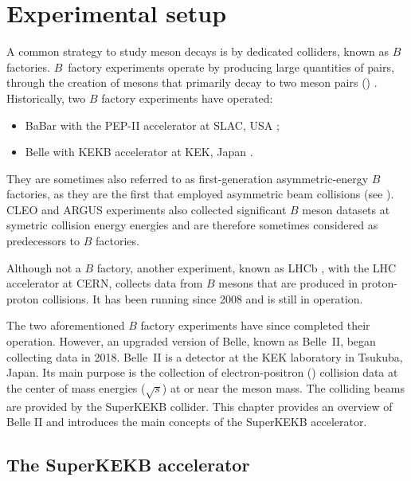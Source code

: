 \chapter{Experimental setup}\label{chap:belle2}

A common strategy to study \B meson decays is by dedicated colliders, known as $B$ factories.
$B$~factory experiments operate by producing large quantities of \BB pairs, through the creation of \FourS mesons that primarily decay to two \B meson pairs (\BB) \cite{Workman:2022ynf}.
Historically, two $B$ factory experiments have operated:
\begin{itemize}
    \item BaBar with the PEP-II accelerator at SLAC, USA \cite{BaBar:1995bns};
    \item Belle with KEKB accelerator at KEK, Japan \cite{Belle:2000cnh}.
\end{itemize}
They are sometimes also referred to as first-generation asymmetric-energy $B$ factories, as they are the first that employed asymmetric beam collisions (see ).
CLEO \cite{CLEO:1982pvq} and ARGUS \cite{ARGUS:1988bds} experiments also collected significant $B$ meson datasets at symetric \epem collision energy \FourS energies and are therefore sometimes considered as predecessors to $B$ factories. 

Although not a $B$ factory, another experiment, known as LHCb \cite{LHCb:2008vvz}, with the LHC accelerator at CERN, collects data from $B$ mesons that are produced in proton-proton collisions.
It has been running since 2008 and is still in operation.

The two aforementioned $B$ factory experiments have since completed their operation.
However, an upgraded version of Belle, known as Belle~II, began collecting data in 2018.
Belle~II is a detector at the KEK laboratory in Tsukuba, Japan.
Its main purpose is the collection of electron-positron (\epem) collision data 
at the center of mass energies ($\sqrt{s}$) at or near the \FourS meson mass.
The colliding beams are provided by the SuperKEKB \epem collider.
This chapter provides an overview of Belle II and introduces the main concepts of the SuperKEKB accelerator.

\section{The SuperKEKB accelerator}\label{sec:superkekb}

